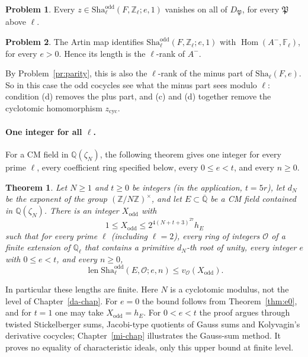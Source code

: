 \documentclass[reqno]{amsart}
\newcounter{chap}
\theoremstyle{definition}
\newtheorem{problem}{Problem}[section]
\theoremstyle{plain}
\newtheorem{theorem}{Theorem}[section]
\theoremstyle{remark}
\newcommand{\Z}{\mathbb{Z}}
\newcommand{\Q}{\mathbb{Q}}
\newcommand{\F}{\mathbb{F}}
\newcommand{\Zl}{\Z_\ell}
\newcommand{\Ql}{\Q_\ell}
\newcommand{\Oc}{\mathcal{O}}
\newcommand{\Hom}{\operatorname{Hom}}
\newcommand{\len}{\operatorname{len}}
\newcommand{\Sha}{\mathrm{Sha}}
\newcommand{\Shao}{\Sha^{\mathrm{odd}}}
\begin{document}
\begin{problem}\label{pr:F-split}
Every \(z \in \Shao_\ell(F, \Zl; e, 1)\) vanishes on all of \(D_{\mathfrak{P}}\), for every \(\mathfrak{P}\) above \(\ell\).
\end{problem}

\begin{problem}\label{pr:F-minus}
The Artin map identifies \(\Shao_\ell(F, \Zl; e, 1)\) with \(\Hom(A^-, \F_\ell)\), for every \(e > 0\).  Hence its length is the \(\ell\)-rank of \(A^-\).
\end{problem}

By Problem~\ref{pr:parity}, this is also the \(\ell\)-rank of the minus part of \(\Sha_\ell(F, e)\).  So in this case the odd cocycles see what the minus part sees modulo \(\ell\): condition (d) removes the plus part, and (c) and (d) together remove the cyclotomic homomorphism \(z_{\mathrm{cyc}}\).

\paragraph{One integer for all \(\ell\).}
For a CM field in \(\Q(\zeta_N)\), the following theorem gives one integer for every prime \(\ell\), every coefficient ring specified below, every \(0 \le e < t\), and every \(n \ge 0\).

\begin{theorem}\label{thm:oddsha}
Let \(N \ge 1\) and \(t \ge 0\) be integers (in the application, \(t = 5r\)), let \(d_N\) be the exponent of the group \((\Z/N\Z)^\times\), and let \(E \subset \overline{\Q}\) be a CM field contained in \(\Q(\zeta_N)\).  There is an integer \(X_{\mathrm{odd}}\) with
\[
  1 \le X_{\mathrm{odd}} \le 2^{4(N + t + 3)^{27}} h_E
\]
such that for every prime \(\ell\) (including \(\ell = 2\)), every ring of integers \(\Oc\) of a finite extension of \(\Ql\) that contains a primitive \(d_N\)-th root of unity, every integer \(e\) with \(0 \le e < t\), and every \(n \ge 0\),
\[
  \len \Shao_\ell(E, \Oc; e, n) \le v_\Oc(X_{\mathrm{odd}}) .
\]
\end{theorem}

In particular these lengths are finite.  Here \(N\) is a cyclotomic modulus, not the level of Chapter~\ref{da-chap}.  For \(e = 0\) the bound follows from Theorem~\ref{thm:e0}, and for \(t = 1\) one may take \(X_{\mathrm{odd}} = h_E\).  For \(0 < e < t\) the proof argues through twisted Stickelberger sums, Jacobi-type quotients of Gauss sums and Kolyvagin's derivative cocycles; Chapter~\ref{mi-chap} illustrates the Gauss-sum method.  It proves no equality of characteristic ideals, only this upper bound at finite level.
\end{document}

